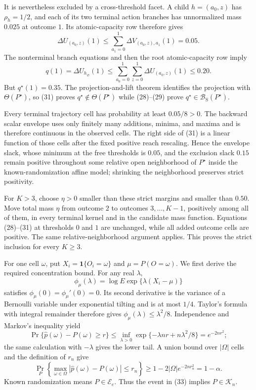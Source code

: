 It is nevertheless excluded by a cross-threshold facet.  A child \(h=(a_0,z)\) has \(\rho_h=1/2\), and each of its two terminal action branches has unnormalized mass \(0.025\) at outcome \(1\).  Its atomic-capacity row therefore gives
\[
 \Delta U_{(a_0,z)}(1)
 \leq\sum_{a_1=0}^1\Delta V_{(a_0,z),a_1}(1)=0.05.        \tag{30}
\]
The nonterminal branch equations and then the root atomic-capacity row imply
\[
 q(1)=\Delta U_{h_\varnothing}(1)
 \leq\sum_{a_0=0}^1\sum_{z=0}^1
       \Delta U_{(a_0,z)}(1)
 \leq0.20.                                                \tag{31}
\]
But \(q^\star(1)=0.35\).  The projection-and-lift theorem identifies the projection with \(\Theta(P^\star)\), so (31) proves \(q^\star\notin\Theta(P^\star)\) while (28)--(29) prove \(q^\star\in\mathcal B_{\mathrm S}(P^\star)\).

Every terminal trajectory cell has probability at least \(0.05/8>0\).  The backward scalar envelope uses only finitely many additions, minima, and maxima and is therefore continuous in the observed cells.  The right side of (31) is a linear function of those cells after the fixed positive reach rescaling.  Hence the envelope slack, whose minimum at the free thresholds is \(0.05\), and the exclusion slack \(0.15\) remain positive throughout some relative open neighborhood of \(P^\star\) inside the known-randomization affine model; shrinking the neighborhood preserves strict positivity.

For \(K>3\), choose \(\eta>0\) smaller than these strict margins and smaller than \(0.50\).  Move total mass \(\eta\) from outcome \(2\) to outcomes \(3,\ldots,K-1\), positively among all of them, in every terminal kernel and in the candidate mass function.  Equations (28)--(31) at thresholds \(0\) and \(1\) are unchanged, while all added outcome cells are positive.  The same relative-neighborhood argument applies.  This proves the strict inclusion for every \(K\geq3\).

For one cell \(\omega\), put \(X_i=\mathbf 1\{O_i=\omega\}\) and \(\mu=P(O=\omega)\).  We first derive the required concentration bound.  For any real \(\lambda\),
\[
 \phi_\mu(\lambda)
 =\log E\exp\{\lambda(X_i-\mu)\}
\]
satisfies \(\phi_\mu(0)=\phi_\mu'(0)=0\).  Its second derivative is the variance of a Bernoulli variable under exponential tilting and is at most \(1/4\).  Taylor's formula with integral remainder therefore gives \(\phi_\mu(\lambda)\leq\lambda^2/8\).  Independence and Markov's inequality yield
\[
 \Pr\{\widehat p(\omega)-P(\omega)\geq r\}
 \leq\inf_{\lambda>0}\exp\{-\lambda nr+n\lambda^2/8\}
 =e^{-2nr^2};                                             \tag{32}
\]
the same calculation with \(-\lambda\) gives the lower tail.  A union bound over \(|\Omega|\) cells and the definition of \(r_n\) give
\[
 \Pr_P\!\left\{\max_{\omega\in\Omega}
 |\widehat p(\omega)-P(\omega)|\leq r_n\right\}
 \geq1-2|\Omega|e^{-2nr_n^2}=1-\alpha.                   \tag{33}
\]
Known randomization means \(P\in\mathcal E_e\).  Thus the event in (33) implies \(P\in\mathcal K_n\).

